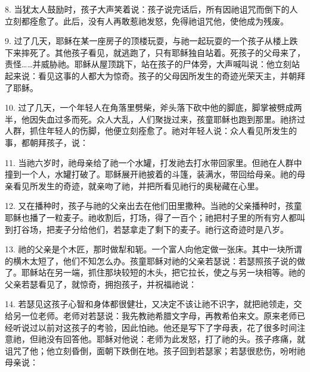 8. 当犹太人鼓励时，孩子大声笑着说：孩子说完话后，所有因祂诅咒而倒下的人立刻都痊愈了。此后，没有人再敢惹祂发怒，免得祂诅咒他，使他成为残废。\par

9. 过了几天，耶稣在某一座房子的顶楼玩耍，与祂一起玩耍的一个孩子从楼上跌下来摔死了。其他孩子看见，就逃跑了，只有耶稣独自站着。死孩子的父母来了，责怪……并威胁祂。耶稣从屋顶跳下，站在孩子的尸体旁，大声喊叫说：他立刻站起来说：看见这事的人都大为惊奇。孩子的父母因所发生的奇迹光荣天主，并朝拜了耶稣。\par

10. 过了几天，一个年轻人在角落里劈柴，斧头落下砍中他的脚底，脚掌被劈成两半，他因失血过多而死。众人大乱，人们聚拢过来，孩童耶稣也跑到那里。祂挤过人群，抓住年轻人的伤脚，他便立刻痊愈了。祂对年轻人说：众人看见所发生的事，都朝拜孩子，说：\par

11. 当祂六岁时，祂母亲给了祂一个水罐，打发祂去打水带回家里。但祂在人群中撞到一个人，水罐打破了。耶稣展开祂披着的斗篷，装满水，带回给母亲。祂的母亲看见所发生的奇迹，就亲吻了祂，并把所看见祂行的奥秘藏在心里。\par

12. 又在播种时，孩子与祂的父亲出去在他们田里撒种。当祂的父亲播种时，孩童耶稣也播了一粒麦子。祂收割后，打场，得了一百个；祂把村子里的所有穷人都叫到打谷场，把麦子分给他们，若瑟拿走了剩下的麦子。祂行这奇迹时是八岁。\par

13. 祂的父亲是个木匠，那时做犁和轭。一个富人向他定做一张床。其中一块所谓的横木太短了，他们不知怎么办。孩童耶稣对祂的父亲若瑟说：若瑟照孩子说的做了。耶稣站在另一端，抓住那块较短的木头，把它拉长，使之与另一块相等。祂的父亲若瑟看见了，就惊奇，拥抱孩子，并祝福祂说：\par

14. 若瑟见这孩子心智和身体都很健壮，又决定不该让祂不识字，就把祂领走，交给另一位老师。老师对若瑟说：我先教祂希腊文字母，再教希伯来文。原来老师已经听说过以前对这孩子的考验，因此怕祂。他还是写下了字母表，花了很多时间注意祂，但祂没有回答他。耶稣对他说：老师为此发怒，打了祂的头。孩子疼痛，就诅咒了他；他立刻昏倒，面朝下跌倒在地。孩子回到若瑟家；若瑟很悲伤，吩咐祂母亲说：\par

